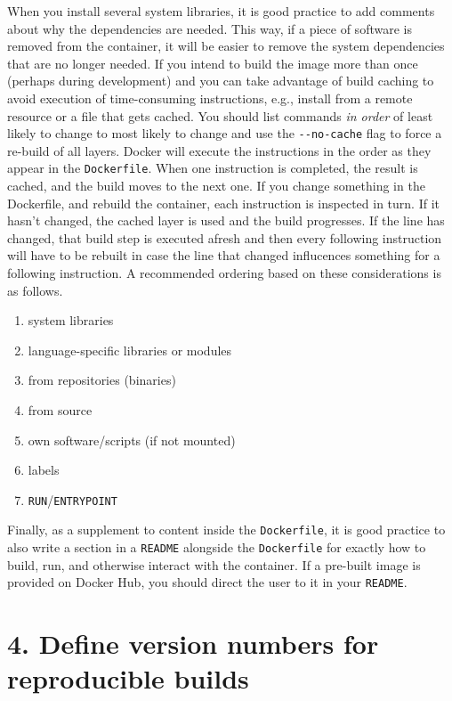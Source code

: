 \documentclass[10pt,letterpaper]{article}
\providecommand{\tightlist}{%
  \setlength{\itemsep}{0pt}\setlength{\parskip}{0pt}}
\begin{document}
When you install several system libraries, it is good practice to add
comments about why the dependencies are needed. This way, if a piece of
software is removed from the container, it will be easier to remove the
system dependencies that are no longer needed. If you intend to build
the image more than once (perhaps during development) and you can take
advantage of build caching to avoid execution of time-consuming
instructions, e.g., install from a remote resource or a file that gets
cached. You should list commands \emph{in order} of least likely to
change to most likely to change and use the \texttt{-\/-no-cache} flag
to force a re-build of all layers. Docker will execute the instructions
in the order as they appear in the \texttt{Dockerfile}. When one
instruction is completed, the result is cached, and the build moves to
the next one. If you change something in the Dockerfile, and rebuild the
container, each instruction is inspected in turn. If it hasn't changed,
the cached layer is used and the build progresses. If the line has
changed, that build step is executed afresh and then every following
instruction will have to be rebuilt in case the line that changed
influcences something for a following instruction. A recommended
ordering based on these considerations is as follows.

\begin{enumerate}
\def\labelenumi{\arabic{enumi}.}
\tightlist
\item
  system libraries
\item
  language-specific libraries or modules
\item
  from repositories (binaries)
\item
  from source
\item
  own software/scripts (if not mounted)
\item
  labels
\item
  \texttt{RUN}/\texttt{ENTRYPOINT}
\end{enumerate}

Finally, as a supplement to content inside the \texttt{Dockerfile}, it
is good practice to also write a section in a \texttt{README} alongside
the \texttt{Dockerfile} for exactly how to build, run, and otherwise
interact with the container. If a pre-built image is provided on Docker
Hub, you should direct the user to it in your \texttt{README}.

\hypertarget{define-version-numbers-for-reproducible-builds}{%
\section*{4. Define version numbers for reproducible
builds}\label{define-version-numbers-for-reproducible-builds}}
\end{document}
